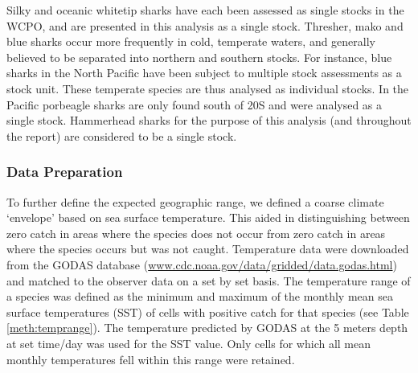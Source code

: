 Silky and oceanic whitetip sharks have each been assessed \citep{Rice2012_a, Rice2013_a} as single stocks in the WCPO, and are presented in this analysis as a single stock.  Thresher, mako and blue sharks occur more frequently in cold, temperate waters, and generally believed to be separated into northern and southern stocks. For instance, blue sharks in the North Pacific have been subject to multiple stock assessments as a stock unit. These temperate species are thus analysed as individual stocks. In the Pacific porbeagle sharks are only found south of 20\degree{}S and were analysed as a single stock. Hammerhead sharks for the purpose of this analysis (and throughout the report) are considered to be a single stock.

\subsubsection{Data Preparation}
To further define the expected geographic range, we defined a coarse climate `envelope' based on sea surface temperature. This aided in distinguishing between zero catch in areas where the species does not occur from zero catch in areas where the species occurs but was not caught. Temperature data were downloaded from the GODAS database (\url{www.cdc.noaa.gov/data/gridded/data.godas.html}) and matched to the observer data on a set by set basis. The temperature range of a species was defined as the minimum and maximum of the monthly mean sea surface temperatures (SST) of cells with positive catch for that species (see Table \ref{meth:temprange}). The temperature predicted by GODAS at the 5 meters depth at set time/day was used for the SST value. Only cells for which all mean monthly temperatures fell within this range were retained. %
 
          
